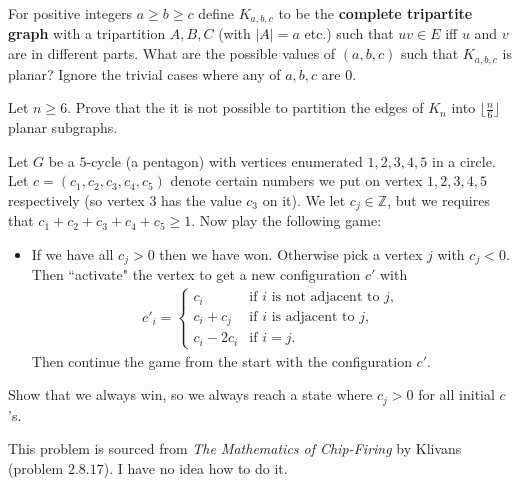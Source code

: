 \begin{enumerate}
    
     For positive integers $a \geq b \geq c$ define $K_{a,b,c}$ to be the \textbf{complete tripartite graph} with a tripartition $A,B,C$ (with $|A| = a$ etc.) such that $uv \in E$ iff $u$ and $v$ are in different parts. What are the possible values of $(a,b,c)$ such that $K_{a,b,c}$ is planar? Ignore the trivial cases where any of $a,b,c$ are $0$.

    
     Let $n \ge 6$. Prove that the it is not possible to partition the edges of $K_n$ into $\lfloor \frac{n}{6} \rfloor$ planar subgraphs.

    Let $G$ be a $5$-cycle (a pentagon) with vertices enumerated $1 ,2,3,4,5$ in a circle. Let $c = (c_1 , c_2, c_3, c_4, c_5)$ denote certain numbers we put on vertex $1,2,3,4,5$ respectively (so vertex $3$ has the value $c_3$ on it). We let $c_j \in \mathbb{Z}$, but we requires that $c_1 + c_2 + c_3 + c_4 + c_5 \geq 1$. Now play the following game:
    \begin{itemize}
        \item[] If we have all $c_j>0$ then we have won. Otherwise pick a vertex $j$ with $c_j < 0$. Then ``activate" the vertex to get a new configuration $c'$ with
        \begin{align*}
            c'_i = \begin{cases}
                c_i & \text{if $i$ is not adjacent to $j$},\\
                c_{i} + c_j & \text{if $i$ is adjacent to $j$},\\
                c_{i} - 2c_i & \text{if $i = j$}.
            \end{cases}
        \end{align*}
        Then continue the game from the start with the configuration $c'$.
    \end{itemize}
    Show that we always win, so we always reach a state where $c_j > 0$ for all initial $c$'s.

    This problem is sourced from \textit{The Mathematics of Chip-Firing} by Klivans (problem $2.8.17$). I have no idea how to do it.
\end{enumerate}